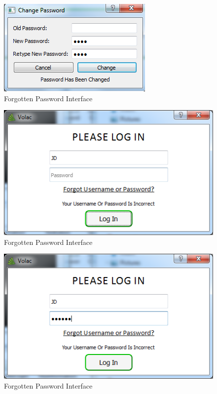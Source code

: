 \begin{figure}[H]
    \includegraphics[width=\textwidth]{./Testing/Images/ChangedPassword.png}
    \caption{Forgotten Password Interface} \label{fig:ChangedPassword}
\end{figure}

\begin{figure}[H]
    \includegraphics[width=\textwidth]{./Testing/Images/ChangedPasswordOld.png}
    \caption{Forgotten Password Interface} \label{fig:ChangedPasswordOld}
\end{figure}

\begin{figure}[H]
    \includegraphics[width=\textwidth]{./Testing/Images/ChangePasswordNew.png}
    \caption{Forgotten Password Interface} \label{fig:ChangePasswordNew}
\end{figure}

